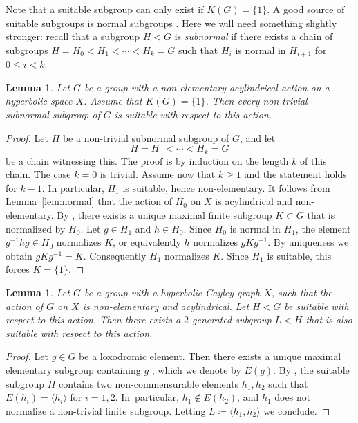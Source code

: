 \documentclass[11pt]{article}
\newtheorem{lemma}[theorem]{Lemma}
\theoremstyle{definition}
\begin{document}
Note that a suitable subgroup can only exist if $K(G) = \{ 1 \}$.
A good source of suitable subgroups is normal subgroups \cite[Lem.\,3.23]{CIOS}. Here we will need something slightly stronger: recall that a subgroup $H < G$ is \emph{subnormal} if there exists a chain of subgroups $H = H_0 < H_1 < \cdots < H_k = G$ such that $H_i$ is normal in $H_{i+1}$ for $0 \leq i < k$.

\begin{lemma}
\label{lem:normal:suitable}
Let $G$ be a group with a non-elementary acylindrical action on a hyperbolic space $X$.
Assume that $K(G) = \{1\}$.
Then every non-trivial subnormal subgroup of $G$ is suitable with respect to this action.
\end{lemma}

\begin{proof}
Let $H$ be a non-trivial subnormal subgroup of $G$, and let
\[
H = H_0 < \cdots < H_k = G
\]
be a chain witnessing this.
The proof is by induction on the length $k$ of this chain.
The case $k = 0$ is trivial.
Assume now that $k \geq 1$ and the statement holds for $k-1$.
In particular, $H_1$ is suitable, hence non-elementary.
It follows from Lemma~\ref{lem:normal} that the action of $H_0$ on $X$ is acylindrical and non-elementary.
By \cite[Lem.\,5.5]{hull}, there exists a unique maximal finite subgroup $K \subset G$ that is normalized by $H_0$. Let $g \in H_1$ and $h \in H_0$.
Since $H_0$ is normal in $H_1$, the element $g^{-1}hg \in H_0$ normalizes $K$, or equivalently $h$ normalizes $gKg^{-1}$.
By uniqueness we obtain $gKg^{-1} = K$.
Consequently $H_1$ normalizes $K$.
Since $H_1$ is suitable, this forces $K = \{1\}$.
\end{proof}

\begin{lemma}
\label{lem:suitable:rank2}
Let $G$ be a group with a hyperbolic Cayley graph $X$, such that the action of $G$ on $X$ is non-elementary and acylindrical.
Let $H < G$ be suitable with respect to this action. Then there exists a $2$-generated subgroup $L < H$ that is also suitable with respect to this action.
\end{lemma}

\begin{proof}
Let $g \in G$ be a loxodromic element. Then there exists a unique maximal elementary subgroup containing $g$ \cite[Lem.\,6.5, Cor.\,6.6]{DGO}, which we denote by $E(g)$. By \cite[Cor.\,5.7]{hull}, the suitable subgroup $H$ contains two non-commensurable elements $h_1, h_2$ such that $E(h_i) = \langle h_i \rangle$ for $i = 1, 2$. In~particular, $h_1 \notin E(h_2)$, and $h_1$ does not normalize a non-trivial finite subgroup. Letting $L \coloneqq \langle h_1, h_2 \rangle$ we conclude.
\end{proof}
\end{document}

